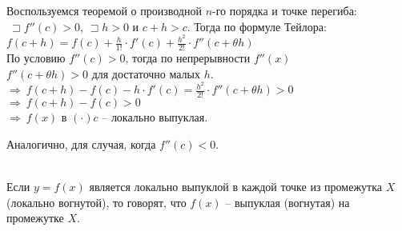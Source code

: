 \documentclass{article}
\begin{document}
\proof

Воспользуемся теоремой о производной $n$-го порядка и точке перегиба: $\ \sqsupset f''(c) > 0$, $\sqsupset h > 0$ и $c + h > c$. Тогда по формуле Тейлора: $f(c+h) = f(c) + \frac{h}{1!} \cdot f'(c) + \frac{h^2}{2!} \cdot f''(c + \theta h)$ \\
По условию $f''(c) > 0$, тогда по непрерывности $f''(x)$ \\
$f''(c + \theta h) > 0$ для достаточно малых $h$. \\
$\Rightarrow \ f(c+h) - f(c) - h \cdot f'(c) = \frac{h^2}{2!} \cdot f''(c + \theta h) > 0$ \\
$\Rightarrow \ f(c+h) - f(c) > 0$ \\
$\Rightarrow \ f(x)$ в $(\cdot) c$ -- локально выпуклая.

Аналогично, для случая, когда $f''(c) < 0$.

 \\
Если $y = f(x)$ является локально выпуклой в каждой точке из промежутка $X$ (локально вогнутой), то говорят, что $f(x)$ -- выпуклая (вогнутая) на промежутке $X$. \\
\end{document}
